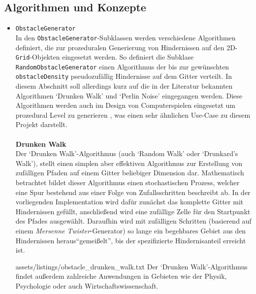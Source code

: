 \subsection{Algorithmen und Konzepte}
\label{subsec:aufbau_backend_konzepte}
\begin{itemize}
    \item \texttt{ObstacleGenerator}\\
    In den \texttt{ObstacleGenerator}-Subklassen werden verschiedene Algorithmen definiert, die zur prozeduralen Generierung von
    Hindernissen auf den 2D-\texttt{Grid}-Objekten eingesetzt werden.
    So definiert die Subklase \texttt{RandomObstacleGenerator} einen Algorithmus der bis zur gewünschten \texttt{obstacleDensity}
    pseudozufällig Hindernisse auf dem Gitter verteilt.
    In diesem Abschnitt soll allerdings kurz auf die in der Literatur bekannten Algorithmen `Drunken Walk' und `Perlin Noise' eingegangen werden.
    Diese Algorithmen werden auch im Design von Computerspielen eingesetzt um prozedural Level zu generieren \cite{koesnaedi2022, andrian2023},
    was einen sehr ähnlichen Use-Case zu diesem Projekt darstellt.\\\\
    \textbf{Drunken Walk}\\
    Der `Drunken Walk'-Algorithmus (auch `Random Walk' oder `Drunkard's Walk'), stellt einen simplen aber effektiven Algorithmus
    zur Erstellung von zufälligen Pfaden auf einem Gitter beliebiger Dimension dar.
    Mathematisch betrachtet bildet dieser Algorithmus einen stochastischen Prozess, welcher eine Spur bestehend aus
    einer Folge von Zufallsschritten beschreibt ab. \cite{pearson1905}
    In der vorliegenden Implementation wird dafür zunächst das komplette Gitter mit Hindernissen gefüllt, anschließend wird
    eine zufällige Zelle für den Startpunkt des Pfades ausgewählt.
    Daraufhin wird mit zufälligen Schritten (basierend auf einem \textit{Mersenne Twister}-Generator) so lange ein begehbares Gebiet aus den Hindernissen heraus``gemeißelt'', bis der
    spezifizierte Hindernisanteil erreicht ist.
    
        {assets/listings/obstacle_drunken_walk.txt}
    Der `Drunken Walk'-Algorithmus findet außerdem zahlreiche Anwendungen in Gebieten wie der Physik, Psychologie oder auch Wirtschaftswissenschaft. \cite{weiss1982, nosofsky1997, kodde1984}\\\\

\end{itemize}
